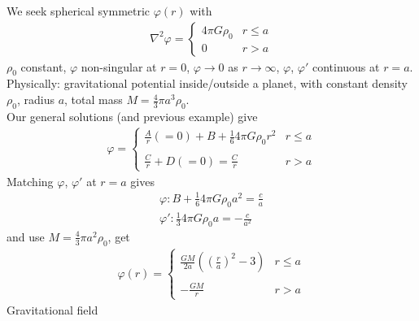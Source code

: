 \documentclass[a4paper]{article}
\begin{document}
\begin{eg}
We seek spherical symmetric $\varphi\left(r\right)$ with
\begin{equation*}
\begin{aligned}
\nabla^2\varphi = \left\{
\begin{array}{ll}
4\pi G \rho_0 & r \leq a\\
0 & r > a
\end{array}
\right.
\end{aligned}
\end{equation*}
$\rho_0$ constant, $\varphi$ non-singular at $r=0$, $\varphi \to 0$ as $r \to \infty$, $\varphi$, $\varphi'$ continuous at $r=a$.\\
Physically: gravitational potential inside/outside a planet, with constant density $\rho_0$, radius $a$, total mass $M=\frac{4}{3}\pi a^3 \rho_0$.\\
Our general solutions (and previous example) give
\begin{equation*}
\begin{aligned}
\varphi = \left\{
\begin{array}{ll}
\frac{A}{r}(=0)+ B+\frac{1}{6}4\pi G \rho_0 r^2 & r\leq a\\\\
\frac{C}{r} + D(=0) = \frac{C}{r} & r>a
\end{array}
\right.
\end{aligned}
\end{equation*}
Matching $\varphi$, $\varphi'$ at $r=a$ gives
\begin{equation*}
\begin{aligned}
\varphi: B+\frac{1}{6}4\pi G \rho_0 a^2 = \frac{c}{a}\\
\varphi': \frac{1}{3}4\pi G\rho_0 a = -\frac{c}{a^2}
\end{aligned}
\end{equation*}
and use $M=\frac{4}{3}\pi a^2\rho_0$, get
\begin{equation*}
\begin{aligned}
\varphi\left(r\right) = \left\{
\begin{array}{ll}
\frac{GM}{2a}\left(\left(\frac{r}{a}\right)^2-3\right) & r\leq a\\\\
-\frac{GM}{r} & r > a
\end{array}
\right.
\end{aligned}
\end{equation*}
Gravitational field
\begin{equation*}
\begin{aligned}

\end{aligned}
\end{equation*}
\end{eg}
\end{document}
